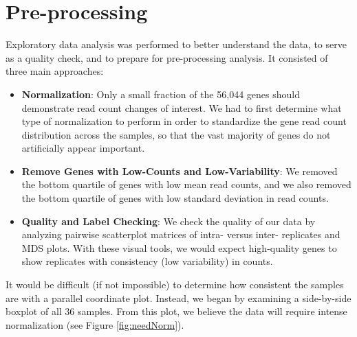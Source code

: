 \documentclass[11pt,a4paper,oldfontcommands,openany]{memoir}
\numberwithin{equation}{section} %
\begin{document}
\section{Pre-processing}

Exploratory data analysis was performed to better understand the data, to serve as a quality check, and to prepare for pre-processing analysis. It consisted of three main approaches:

\begin{itemize}

\item \textbf{Normalization}: Only a small fraction of the 56,044 genes should demonstrate read count changes of interest. We had to first determine what type of normalization to perform in order to standardize the gene read count distribution across the samples, so that the vast majority of genes do not artificially appear important.

\item \textbf{Remove Genes with Low-Counts and Low-Variability}: We removed the bottom quartile of genes with low mean read counts, and we also removed the bottom quartile of genes with low standard deviation in read counts.

\item \textbf{Quality and Label Checking}: We check the quality of our data by analyzing pairwise scatterplot matrices of intra- versus inter- replicates and MDS plots. With these visual tools, we would expect high-quality genes to show replicates with consistency (low variability) in counts.

\end{itemize}

It would be difficult (if not impossible) to determine how consistent the samples are with a parallel coordinate plot. Instead, we began by examining a side-by-side boxplot of all 36 samples. From this plot, we believe the data will require intense normalization (see Figure \ref{fig:needNorm}).

\clearpage
\end{document}
